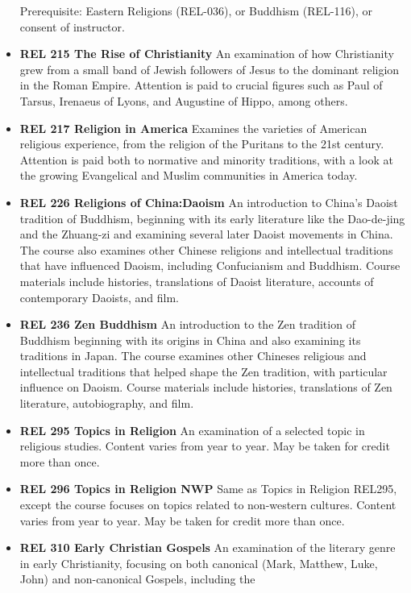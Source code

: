 \documentclass[
  letterpaper,
]{scrbook}
\begin{document}
\begin{itemize}
  Prerequisite: Eastern Religions (REL-036), or Buddhism (REL-116), or
  consent of instructor.
\item
  \textbf{REL 215 The Rise of Christianity} An examination of how
  Christianity grew from a small band of Jewish followers of Jesus to
  the dominant religion in the Roman Empire. Attention is paid to
  crucial figures such as Paul of Tarsus, Irenaeus of Lyons, and
  Augustine of Hippo, among others.\\
\item
  \textbf{REL 217 Religion in America} Examines the varieties of
  American religious experience, from the religion of the Puritans to
  the 21st century. Attention is paid both to normative and minority
  traditions, with a look at the growing Evangelical and Muslim
  communities in America today.
\item
  \textbf{REL 226 Religions of China:Daoism} An introduction to China's
  Daoist tradition of Buddhism, beginning with its early literature like
  the Dao-de-jing and the Zhuang-zi and examining several later Daoist
  movements in China. The course also examines other Chinese religions
  and intellectual traditions that have influenced Daoism, including
  Confucianism and Buddhism. Course materials include histories,
  translations of Daoist literature, accounts of contemporary Daoists,
  and film.\\
\item
  \textbf{REL 236 Zen Buddhism} An introduction to the Zen tradition of
  Buddhism beginning with its origins in China and also examining its
  traditions in Japan. The course examines other Chineses religious and
  intellectual traditions that helped shape the Zen tradition, with
  particular influence on Daoism. Course materials include histories,
  translations of Zen literature, autobiography, and film.
\item
  \textbf{REL 295 Topics in Religion} An examination of a selected topic
  in religious studies. Content varies from year to year. May be taken
  for credit more than once.
\item
  \textbf{REL 296 Topics in Religion NWP} Same as Topics in Religion
  REL295, except the course focuses on topics related to non-western
  cultures. Content varies from year to year. May be taken for credit
  more than once.
\item
  \textbf{REL 310 Early Christian Gospels} An examination of the
  literary genre in early Christianity, focusing on both canonical
  (Mark, Matthew, Luke, John) and non-canonical Gospels, including the

\end{itemize}
\end{document}

